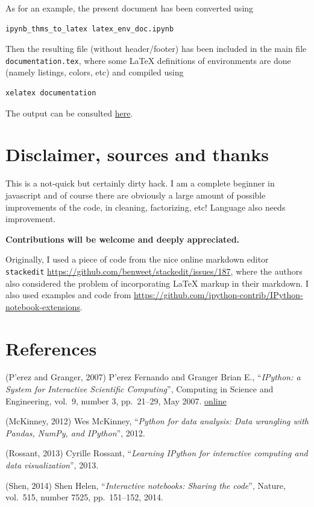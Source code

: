 \begin{example}
As for an example, the present document has been converted using

\begin{verbatim}
ipynb_thms_to_latex latex_env_doc.ipynb
\end{verbatim}

Then the resulting file (without header/footer) has been included in the
main file \texttt{documentation.tex}, where some LaTeX definitions of
environments are done (namely listings, colors, etc) and compiled using

\begin{verbatim}
xelatex documentation
\end{verbatim}

The output can be consulted \href{documentation.pdf}{here}.
\end{example}

    \section{Disclaimer, sources and
thanks}\label{disclaimer-sources-and-thanks}

    This is a not-quick but certainly dirty hack. I am a complete beginner
in javascript and of course there are obviously a large amount of
possible improvements of the code, in cleaning, factorizing, etc!
Language also needs improvement.

\textbf{Contributions will be welcome and deeply appreciated.}

Originally, I used a piece of code from the nice online markdown editor
\texttt{stackedit}
\url{https://github.com/benweet/stackedit/issues/187}, where the authors
also considered the problem of incorporating LaTeX markup in their
markdown. I also used examples and code from
\url{https://github.com/ipython-contrib/IPython-notebook-extensions}.

    \section{References}\label{references}

(P'erez and Granger, 2007) P'erez Fernando and Granger Brian E.,
``\emph{IPython: a System for Interactive Scientific Computing}'',
Computing in Science and Engineering, vol.~9, number 3, pp.~21--29, May
2007. \href{http://ipython.org}{online}

(McKinney, 2012) Wes McKinney, ``\emph{Python for data analysis: Data
wrangling with Pandas, NumPy, and IPython}'', 2012.

(Rossant, 2013) Cyrille Rossant, ``\emph{Learning IPython for
interactive computing and data visualization}'', 2013.

(Shen, 2014) Shen Helen, ``\emph{Interactive notebooks: Sharing the
code}'', Nature, vol.~515, number 7525, pp.~151--152, 2014.


    
    
%
%

    
    